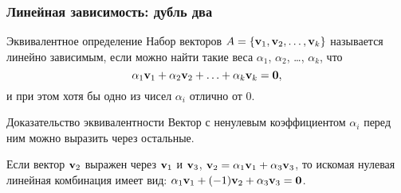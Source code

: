 \begin{frame}
  \frametitle{Линейная зависимость: дубль два}

\begin{block}{Эквивалентное определение} Набор векторов $A = \{ \mathbf{v}_1, \mathbf{v}_2, \ldots, \mathbf{v}_k\}$ называется \alert{линейно зависимым},
  если можно найти такие веса $\alpha_1$, $\alpha_2$, \ldots, $\alpha_k$, что
  \[
  \alpha_1 \mathbf{v}_1 + \alpha_2 \mathbf{v}_2 + \ldots + \alpha_k \mathbf{v}_k = \mathbf{0},  
  \]
  и при этом хотя бы одно из чисел $\alpha_i$ отлично от $0$. 
\end{block}

\pause

\begin{block}{Доказательство эквивалентности}
Вектор с ненулевым коэффициентом $\alpha_i$ перед ним можно выразить через остальные. 
\pause

Если вектор $\mathbf{v}_2$ выражен через $\mathbf{v}_1$ и $\mathbf{v}_3$, $\mathbf{v}_2 = \alpha_1 \mathbf{v}_1 + \alpha_3 \mathbf{v}_3$, 
то искомая нулевая линейная комбинация имеет вид: $\alpha_1 \mathbf{v}_1 +(-1)\mathbf{v}_2 + \alpha_3 \mathbf{v}_3=\mathbf{0}$.
\end{block}

\end{frame}